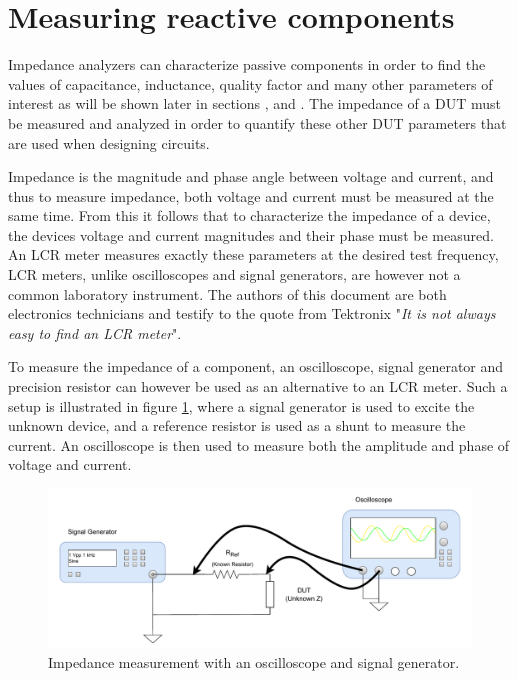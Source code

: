 \section{Measuring reactive components} \label{sec:MeasureReactiveComponents}
Impedance analyzers can characterize passive components in order to find the values of capacitance, inductance, quality factor and many other parameters of interest as will be shown later in sections ,  and . The impedance of a DUT must be measured and analyzed in order to quantify these other DUT parameters that are used when designing circuits.

Impedance is the magnitude and phase angle between voltage and current, and thus to measure impedance, both voltage and current must be measured at the same time. From this it follows that to characterize the impedance of a device, the devices voltage and current magnitudes and their phase must be measured. An LCR meter measures exactly these parameters
at the desired test frequency, LCR meters, unlike oscilloscopes and signal generators, are however not a common laboratory instrument. The authors of this document are both
electronics technicians and testify to the quote from Tektronix \Cite{TextronixZMeas} "\textit{It is not always easy to find an LCR meter}". 

To measure the impedance of a component, an oscilloscope, signal generator and precision resistor can however be used as an alternative to an LCR meter. Such a setup is illustrated in figure \ref{fig_2.1_ImpedanceMeas}, where a signal generator is used to excite the unknown device, and a reference resistor is used as a shunt to measure the current. An oscilloscope is then used to measure both the amplitude and phase of voltage and current. 

\begin{figure}[H]
    \centering
    \includegraphics[width=1\textwidth]{Sections/2_ProblemAnalysis/Figures/ScopeGenZMeas.pdf}
    \caption{Impedance measurement with an oscilloscope and signal generator.}
    \label{fig_2.1_ImpedanceMeas}
\end{figure}


